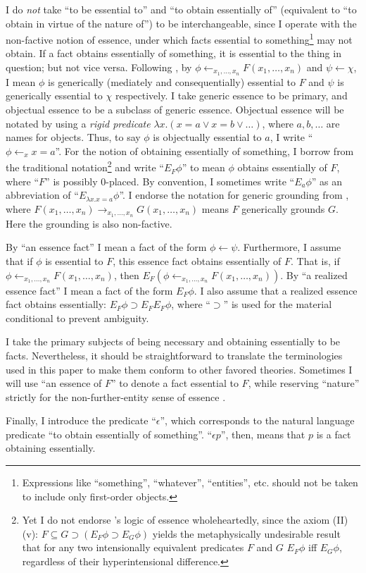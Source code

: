 \documentclass[12pt]{article}
\begin{document}
I do \textit{not} take ``to be essential to'' and ``to obtain essentially of'' (equivalent to ``to obtain in virtue of the nature of'') to be interchangeable, since I operate with the non-factive notion of essence, under which facts essential to something\footnote{Expressions like ``something'', ``whatever'', ``entities'', etc. should not be taken to include only first-order objects.} may not obtain. If a fact obtains essentially of something, it is essential to the thing in question; but not vice versa. Following \citet{Fine2015-FINUFF}, by $\phi \bm{\leftarrow}_{x_1, \dots ,x_n} F(x_1, \dots ,x_n)$ and $\psi \bm{\leftarrow} \chi$, I mean $\phi$ is generically (mediately and consequentially) essential to $F$ and $\psi$ is generically essential to $\chi$ respectively. I take generic essence to be primary, and objectual essence to be a subclass of generic essence. Objectual essence will be notated by using a \textit{rigid predicate} $\lambda x. (x = a \lor x = b \lor \dots)$, where $a, b, \dots$ are names for objects. Thus, to say $\phi$ is objectually essential to $a$, I write ``$\phi \bm{\leftarrow}_x x = a$''. For the notion of obtaining essentially of something, I borrow from the traditional notation\footnote{Yet I do not endorse \citet{Fine1995-FINTLO}'s logic of essence wholeheartedly, since the axiom (II) (v): $F \subseteq G \supset (E_F \phi \supset E_G \phi)$ yields the metaphysically undesirable result that for any two intensionally equivalent predicates $F$ and $G$ $E_F \phi$ iff $E_G \phi$, regardless of their hyperintensional difference.} and write ``$E_F \phi$'' to mean $\phi$ obtains essentially of $F$, where ``$F$'' is possibly 0-placed. By convention, I sometimes write ``$E_a \phi$'' as an abbreviation of ``$E_{\lambda x. x=a} \phi$''. I endorse the notation for generic grounding from \citet{Fine2015-FINUFF}, where $F(x_1, \dots, x_n) \bm{\rightarrow}_{x_1, \dots ,x_n} G(x_1, \dots ,x_n)$ means $F$ generically grounds $G$. Here the grounding is also non-factive. 
\par  
By ``an essence fact'' I mean a fact of the form $\phi \bm{\leftarrow} \psi$. Furthermore, I assume that if $\phi$ is essential to $F$, this essence fact obtains essentially of $F$. That is, if $\phi \bm{\leftarrow}_{x_1,\dots,x_n} F(x_1,\dots,x_n)$, then $E_F (\phi \bm{\leftarrow}_{x_1,\dots,x_n} F(x_1,\dots,x_n))$. By ``a realized essence fact'' I mean a fact of the form $E_F \phi$. I also assume that a realized essence fact obtains essentially: $E_F \phi \supset E_F E_F \phi$, where ``$\supset$'' is used for the material conditional to prevent ambiguity. 
\par
I take the primary subjects of being necessary and obtaining essentially to be facts.  Nevertheless, it should be straightforward to translate the terminologies used in this paper to make them conform to other favored theories. Sometimes I will use ``an essence of $F$'' to denote a fact essential to $F$, while reserving ``nature'' strictly for the non-further-entity sense of essence \citep{Lowe2008-LOWTNO}. 
\par
Finally, I introduce the predicate ``$\epsilon$'', which corresponds to the natural language predicate ``to obtain essentially of something''. ``$\epsilon p$'', then, means that $p$ is a fact obtaining essentially. 
\end{document}
